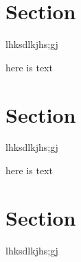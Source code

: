 \documentclass[a4paper, 11pt]{report}
\begin{document}
\section{Section}
lhksdlkjhs;gj

here is text
\section{Section}
lhksdlkjhs;gj

here is text
\section{Section}
lhksdlkjhs;gj
\end{document}
